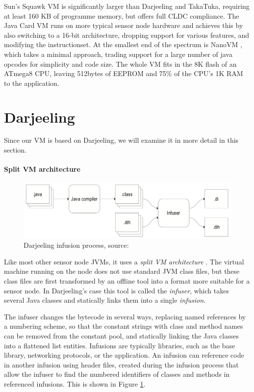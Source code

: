 Sun's Squawk VM \cite{Shaylor:2003ws} is significantly larger than Darjeeling and TakaTuka, requiring at least 160 KB of programme memory, but offers full CLDC compliance. The Java Card VM \cite{javacard} runs on more typical sensor node hardware and achieves this by also switching to a 16-bit architecture, dropping support for various features, and modifying the instructionset. At the smallest end of the spectrum is NanoVM \cite{Harbaum}, which takes a minimal approach, trading support for a large number of java opcodes for simplicity and code size. The whole VM fits in the 8K flash of an ATmega8 CPU, leaving 512bytes of EEPROM and 75\% of the CPU's 1K RAM to the application.

\section{Darjeeling}
Since our VM is based on Darjeeling, we will examine it in more detail in this section.

\paragraph{Split VM architecture}
\begin{figure}
\centering
\includegraphics[width=0.6\linewidth]{darjeeling-infusion-process}
\caption[Darjeeling infusion process]{Darjeeling infusion process, source: \cite{Brouwers:2009cj}}
\label{fig-darjeeling-infusion-process}
\end{figure}
Like most other sensor node JVMs, it uses a \emph{split VM architecture} \cite{Simon:2006wd}. The virtual machine running on the node does not use standard JVM class files, but these class files are first transformed by an offline tool into a format more suitable for a sensor node. In Darjeeling's case this tool is called the \emph{infuser}, which takes several Java classes and statically links them into a single \emph{infusion}.

The infuser changes the bytecode in several ways, replacing named references by a numbering scheme, so that the constant strings with class and method names can be removed from the constant pool, and statically linking the Java classes into a flattened list entities. Infusions are typically libraries, such as the  base library, networking protocols, or the application. An infusion can reference code in another infusion using header files, created during the infusion process that allow the infuser to find the numbered identifiers of classes and methods in referenced infusions. This is shown in Figure \ref{fig-darjeeling-infusion-process}.

